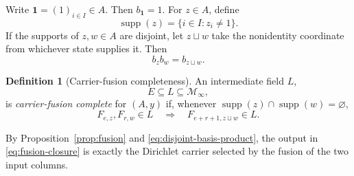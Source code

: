 \documentclass[11pt]{article}
\theoremstyle{definition}
\newtheorem{definition}[theorem]{Definition}
\theoremstyle{remark}
\newcommand{\cM}{\mathcal M}
\newcommand{\supp}{\operatorname{supp}}
\begin{document}
Write \(\mathbf1=(1)_{i\in I}\in A\).  Then \(b_{\mathbf1}=1\).  For
\(z\in A\), define
\[
 \supp(z)=\{i\in I:z_i\neq1\}.
\]
If the supports of \(z,w\in A\) are disjoint, let \(z\sqcup w\) take the nonidentity coordinate
from whichever state supplies it.  Then
\begin{equation}\label{eq:disjoint-basis-product}
 b_zb_w=b_{z\sqcup w}.
\end{equation}

\begin{definition}[Carrier-fusion completeness]\label{def:fusion-complete}
An intermediate field \(L\),
\[
 E\subseteq L\subseteq\cM_\infty,
\]
is \emph{carrier-fusion complete} for \((A,y)\) if, whenever
\(\supp(z)\cap\supp(w)=\varnothing\),
\begin{equation}\label{eq:fusion-closure}
 F_{e,z},F_{r,w}\in L
 \quad\Longrightarrow\quad
 F_{e+r+1,z\sqcup w}\in L.
\end{equation}
\end{definition}

By Proposition~\ref{prop:fusion} and \eqref{eq:disjoint-basis-product}, the output in
\eqref{eq:fusion-closure} is exactly the Dirichlet carrier selected by the fusion of the two input
columns.
\end{document}
